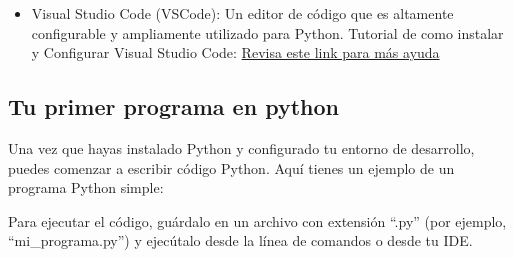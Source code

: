 \begin{itemize}
    \item Visual Studio Code (VSCode): Un editor de código que es altamente configurable y ampliamente utilizado para Python. Tutorial de como instalar y Configurar Visual Studio Code:
    \href{https://www.youtube.com/watch?v=X_Z7d04x9-E}{Revisa este link para más ayuda}
    \begin{figure}[h]
        \centering
      \end{figure}
\end{itemize}

\subsection{Tu primer programa en python}

Una vez que hayas instalado Python y configurado tu entorno de desarrollo, puedes comenzar a escribir código Python. Aquí tienes un ejemplo de un programa Python simple:
\begin{figure}[h]
    \centering
  \end{figure}
Para ejecutar el código, guárdalo en un archivo con extensión ``.py'' (por ejemplo, ``mi\_programa.py'') y ejecútalo desde la línea de comandos o desde tu IDE.


